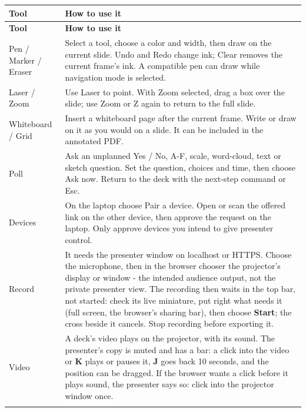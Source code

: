 \documentclass[a4paper,11pt]{article}
\begin{document}
\label{sec:use-annotation-and-optional-presenter-tools}
{\small
\begin{longtable}{>{\raggedright\arraybackslash}p{}>{\raggedright\arraybackslash}p{}}
\toprule
\textbf{Tool} & \textbf{How to use it} \\
\midrule
\endfirsthead
\toprule
\textbf{Tool} & \textbf{How to use it} \\
\midrule
\endhead
\midrule
\endfoot
\bottomrule
\endlastfoot
Pen /\allowbreak{} Marker /\allowbreak{} Eraser & Select a tool, choose a color and width, then draw on the current slide.\allowbreak{} Undo and Redo change ink; Clear removes the current frame's ink.\allowbreak{} A compatible pen can draw while navigation mode is selected. \\ \addlinespace[3pt]
Laser /\allowbreak{} Zoom & Use Laser to point.\allowbreak{} With Zoom selected, drag a box over the slide; use Zoom or Z again to return to the full slide. \\ \addlinespace[3pt]
Whiteboard /\allowbreak{} Grid & Insert a whiteboard page after the current frame.\allowbreak{} Write or draw on it as you would on a slide.\allowbreak{} It can be included in the annotated PDF. \\ \addlinespace[3pt]
Poll & Ask an unplanned Yes /\allowbreak{} No, A-\allowbreak{}F, scale, word-\allowbreak{}cloud, text or sketch question.\allowbreak{} Set the question, choices and time, then choose Ask now.\allowbreak{} Return to the deck with the next-\allowbreak{}step command or Esc. \\ \addlinespace[3pt]
Devices & On the laptop choose Pair a device.\allowbreak{} Open or scan the offered link on the other device, then approve the request on the laptop.\allowbreak{} Only approve devices you intend to give presenter control. \\ \addlinespace[3pt]
Record & It needs the presenter window on localhost or HTTPS.\allowbreak{} Choose the microphone, then in the browser chooser the projector's display or window -\allowbreak{} the intended audience output, not the private presenter view.\allowbreak{} The recording then waits in the top bar, not started: check its live miniature, put right what needs it (full screen, the browser's sharing bar), then choose \textbf{Start}; the cross beside it cancels.\allowbreak{} Stop recording before exporting it. \\ \addlinespace[3pt]
Video & A deck's video plays on the projector, with its sound.\allowbreak{} The presenter's copy is muted and has a bar: a click into the video or \textbf{K} plays or pauses it, \textbf{J} goes back 10 seconds, and the position can be dragged.\allowbreak{} If the browser wants a click before it plays sound, the presenter says so: click into the projector window once. \\ \addlinespace[3pt]

\end{longtable}}
\end{document}
